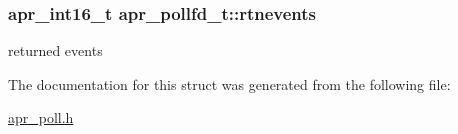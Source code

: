 \subsubsection[{\texorpdfstring{rtnevents}{rtnevents}}]{\setlength{\rightskip}{0pt plus 5cm}apr\+\_\+int16\+\_\+t apr\+\_\+pollfd\+\_\+t\+::rtnevents}\hypertarget{structapr__pollfd__t_aed5b2109b27984975309922bfa84e3f6}{}\label{structapr__pollfd__t_aed5b2109b27984975309922bfa84e3f6}
returned events 

The documentation for this struct was generated from the following file\+:\begin{DoxyCompactItemize}
\item 
\hyperlink{apr__poll_8h}{apr\+\_\+poll.\+h}\end{DoxyCompactItemize}
